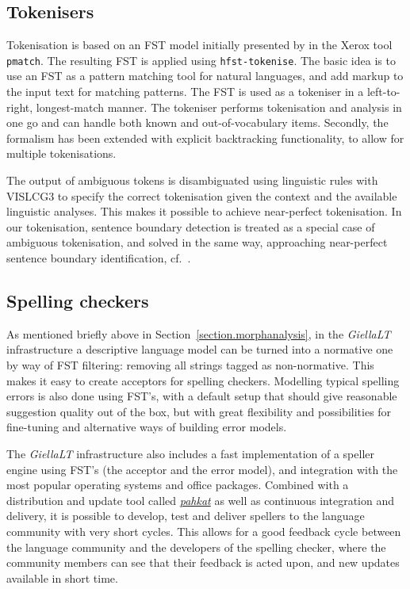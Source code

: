 \documentclass[free]{flammie}
\begin{document}
\subsection{Tokenisers}

Tokenisation is based on an FST model initially presented by
\cite{karttunen2011beyond} in the Xerox tool \texttt{pmatch}. The resulting
FST is applied using \texttt{hfst-tokenise}.  The basic idea is to use an FST as
a pattern matching tool for natural languages, and add markup to the input text
for matching patterns. The FST is used as a tokeniser in a left-to-right,
longest-match manner.  The tokeniser performs tokenisation and analysis in one
go and can handle both known and out-of-vocabulary items.  Secondly, the
formalism has been extended with explicit backtracking functionality, to allow
for multiple tokenisations.

The output of ambiguous tokens is disambiguated using linguistic rules with
VISLCG3 to specify the correct tokenisation given the context and the available
linguistic analyses. This makes it possible to achieve near-perfect
tokenisation.  In our tokenisation, sentence boundary detection is treated as a
special case of ambiguous tokenisation, and solved in the same way, approaching
near-perfect sentence boundary identification, cf.\
\cite{wiechetek-etal-2019-seeing}.



\subsection{Spelling checkers}

As mentioned briefly above in Section~\ref{section.morphanalysis}, in the
\textit{GiellaLT} infrastructure a descriptive language model can be turned into
a normative one by way of FST filtering: removing all strings tagged as
non-normative. This makes it easy to create acceptors for spelling checkers.
Modelling typical spelling errors is also done using FST's, with a default setup
that should give reasonable suggestion quality out of the box, but with great
flexibility and possibilities for fine-tuning and alternative ways of building
error models.

The \textit{GiellaLT} infrastructure also includes a fast implementation of a
speller engine using FST's (the acceptor and the error model), and integration
with the most popular operating systems and office packages. Combined with a
distribution and update tool called
\textit{\href{https://github.com/divvun/?q=pahkat}{pahkat}} as well as
continuous integration and delivery, it is possible to develop, test and deliver
spellers to the language community with very short cycles. This allows for a
good feedback cycle between the language community and the developers of the
spelling checker, where the community members can see that their feedback is
acted upon, and new updates available in short time.
\end{document}
